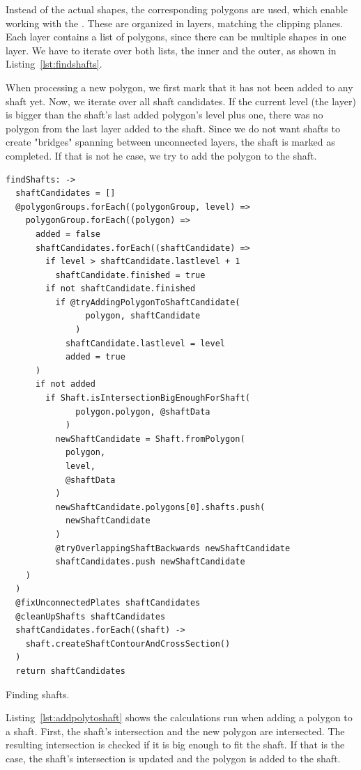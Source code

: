 \documentclass[../ClassicThesis.tex]{subfiles}
\begin{document}
Instead of the actual shapes, the corresponding polygons are used, which enable working with the \jsclipper{}. These are organized in layers, matching the clipping planes. Each layer contains a list of polygons, since there can be multiple shapes in one layer. We have to iterate over both lists, the inner and the outer, as shown in Listing~\ref{lst:findshafts}.

When processing a new polygon, we first mark that it has not been added to any shaft yet. Now, we iterate over all shaft candidates. If the current level (the layer) is bigger than the shaft's last added polygon's level plus one, there was no polygon from the last layer added to the shaft. Since we do not want shafts to create "bridges" spanning between unconnected layers, the shaft is marked as completed. If that is not he case, we try to add the polygon to the shaft.

\begin{listing}
\begin{verbatim}
findShafts: ->
  shaftCandidates = []
  @polygonGroups.forEach((polygonGroup, level) =>
    polygonGroup.forEach((polygon) =>
      added = false
      shaftCandidates.forEach((shaftCandidate) =>
        if level > shaftCandidate.lastlevel + 1
          shaftCandidate.finished = true
        if not shaftCandidate.finished
          if @tryAddingPolygonToShaftCandidate(
                polygon, shaftCandidate
              )
            shaftCandidate.lastlevel = level
            added = true
      )
      if not added
        if Shaft.isIntersectionBigEnoughForShaft(
              polygon.polygon, @shaftData
            )
          newShaftCandidate = Shaft.fromPolygon(
            polygon,
            level,
            @shaftData
          )
          newShaftCandidate.polygons[0].shafts.push(
            newShaftCandidate
          )
          @tryOverlappingShaftBackwards newShaftCandidate
          shaftCandidates.push newShaftCandidate
    )
  )
  @fixUnconnectedPlates shaftCandidates
  @cleanUpShafts shaftCandidates
  shaftCandidates.forEach((shaft) ->
    shaft.createShaftContourAndCrossSection()
  )
  return shaftCandidates
\end{verbatim}
\caption{Finding shafts.}
\label{lst:findshafts}
\end{listing}

Listing~\ref{lst:addpolytoshaft} shows the calculations run when adding a polygon to a shaft. First, the shaft's intersection and the new polygon are intersected. The resulting intersection is checked if it is big enough to fit the shaft. If that is the case, the shaft's intersection is updated and the polygon is added to the shaft.
\end{document}
